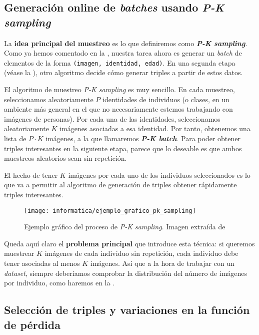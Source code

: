\subsection{Generación online de \textit{batches} usando \textit{P-K sampling}} \label{isubs:muestreo_datos_pk_sampling_teoria}

La \textbf{idea principal del muestreo} es lo que definiremos como \textbf{\textit{P-K sampling}}. Como ya hemos comentado en la , nuestra tarea ahora es generar un \textit{batch} de elementos de la forma \lstinline{(imagen, identidad, edad)}. En una segunda etapa (véase la ), otro algoritmo decide cómo generar triples a partir de estos datos.

El algoritmo de muestreo \textit{P-K sampling} es muy sencillo. En cada muestreo, seleccionamos aleatoriamente $P$ identidades de individuos (o clases, en un ambiente más general en el que no necesariamente estemos trabajando con imágenes de personas). Por cada una de las identidades, seleccionamos aleatoriamente $K$ imágenes asociadas a esa identidad. Por tanto, obtenemos una lista de $P \cdot K$ imágenes, a la que llamaremos \textbf{\textit{P-K batch}}. Para poder obtener triples interesantes en la siguiente etapa, parece que lo deseable es que ambos muestreos aleatorios sean sin repetición.

El hecho de tener $K$ imágenes por cada uno de los individuos seleccionados es lo que va a permitir al algoritmo de generación de triples obtener rápidamente triples interesantes.

\begin{figure}[!hbtp]
    \centering
    \texttt{[image: informatica/ejemplo\_grafico\_pk\_sampling]}
    \caption{Ejemplo gráfico del proceso de \textit{P-K sampling}. Imagen extraída de \cite{informatica:paper_image_pk_sampling}}
\end{figure}

Queda aquí claro el \textbf{problema principal} que introduce esta técnica: si queremos muestrear $K$ imágenes de cada individuo sin repetición, cada individuo debe tener asociadas al menos $K$ imágenes. Así que a la hora de trabajar con un \textit{dataset}, siempre deberíamos comprobar la distribución del número de imágenes por individuo, como haremos en la .

\subsection{Selección de triples y variaciones en la función de pérdida} \label{isubs:seleccion_de_triples}


